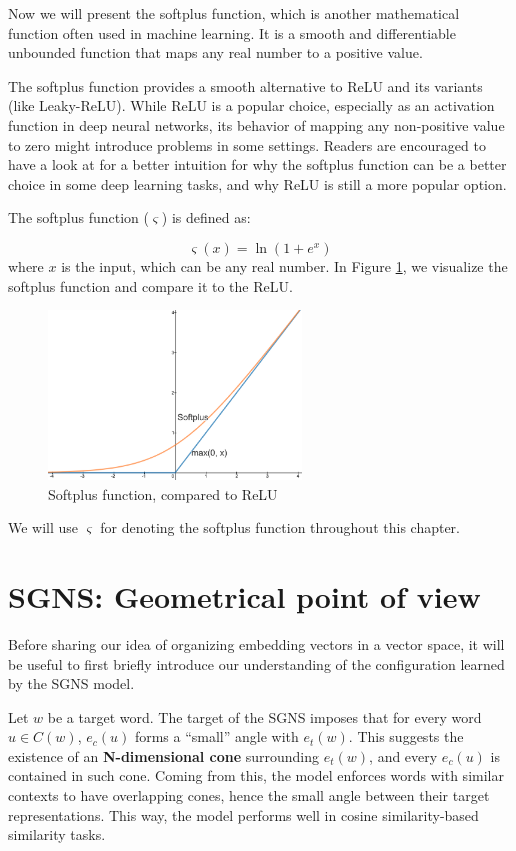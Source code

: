 Now we will present the softplus function, which is another mathematical function often used in machine learning. It is a smooth and differentiable unbounded function that maps any real number to a positive value.

The softplus function provides a smooth alternative to \ac{ReLU} and its variants (like Leaky-\ac{ReLU}). While \ac{ReLU} is a popular choice, especially as an activation function in deep neural networks, its behavior of mapping any non-positive value to zero might introduce problems in some settings. Readers are encouraged to have a look at \cite{softplus} for a better intuition for why the softplus function can be a better choice in some deep learning tasks, and why \ac{ReLU} is still a more popular option.

The softplus function ($\varsigma$) is defined as:

\[ \varsigma(x) = \ln(1 + e^x) \]
\noindent
where $x$ is the input, which can be any real number. In Figure \ref{fig:softplus}, we visualize the softplus function and compare it to the \ac{ReLU}.

\begin{figure}[H]
    \centering
    \includegraphics[width=0.6\textwidth]{img/softplus.PNG}
    \caption{Softplus function, compared to \ac{ReLU}}
    \label{fig:softplus}
\end{figure}

We will use $\varsigma$ for denoting the softplus function throughout this chapter.


\section{SGNS: Geometrical point of view}
Before sharing our idea of organizing embedding vectors in a vector space, it will be useful to first briefly introduce our understanding of the configuration learned by the \ac{SGNS} model. 

Let $w$ be a target word. The target of the \ac{SGNS} imposes that for every word $u \in C(w)$, $e_c(u)$ forms a “small” angle with $e_t(w)$.
This suggests the existence of an \textbf{N-dimensional cone} surrounding $e_t(w)$, and every $e_c(u)$ is contained in such cone. Coming from this, the model enforces words with similar contexts to have overlapping cones, hence the small angle between their target representations. This way, the model performs well in cosine similarity-based similarity tasks.

